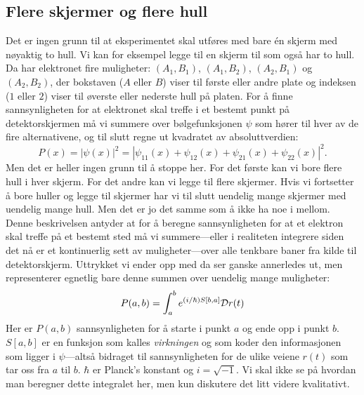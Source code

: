 \subsection{Flere skjermer og flere hull}
Det er ingen grunn til at eksperimentet skal utføres med bare \'en skjerm med nøyaktig to hull. Vi kan for eksempel legge til en skjerm til som også har to hull. Da har elektronet fire muligheter: $(A_1, B_1)$, $(A_1, B_2)$, $(A_2,B_1)$ og $(A_2,B_2)$, der bokstaven ($A$ eller $B$) viser til første eller andre plate og indeksen ($1$ eller $2$) viser til øverste eller nederste hull på platen. For å finne sannsynligheten for at elektronet skal treffe i et bestemt punkt på detektorskjermen må vi summere over bølgefunksjonen $\psi$ som hører til hver av de fire alternativene, og til slutt regne ut kvadratet av absoluttverdien:
\begin{displaymath}
	P(x) = |\psi(x)|^2 = |\psi_{11}(x) + \psi_{12}(x) + \psi_{21}(x) + \psi_{22}(x)|^2.
\end{displaymath}
Men det er heller ingen grunn til å stoppe her. For det første kan vi bore flere hull i hver skjerm. For det andre kan vi legge til flere skjermer. Hvis vi fortsetter å bore huller og legge til skjermer har vi til slutt uendelig mange skjermer med uendelig mange hull. Men det er jo det samme som å ikke ha noe i mellom. Denne beskrivelsen antyder at for å beregne sannsynligheten for at et elektron skal treffe på et bestemt sted må vi summere---eller i realiteten integrere siden det nå er et kontinuerlig sett av muligheter---over alle tenkbare baner fra kilde til detektorskjerm. Uttrykket vi ender opp med da ser ganske annerledes ut, men representerer egnetlig bare denne summen over uendelig mange muligheter:
\begin{displaymath}
	P(a,b) = \int_a^be^{(i/\hbar)S[b,a]}{\cal D}r(t)
\end{displaymath}
Her er $P(a,b)$ sannsynligheten for å starte i punkt $a$ og ende opp i punkt $b$. $S[a,b]$ er en funksjon som kalles \emph{virkningen} og som koder den informasjonen som ligger i $\psi$---altså bidraget til sannsynligheten for de ulike veiene $r(t)$ som tar oss fra $a$ til $b$. $\hbar$ er Planck's konstant og $i=\sqrt{-1}$. 
Vi skal ikke se på hvordan man beregner dette integralet her, men kun diskutere det litt videre kvalitativt. 

